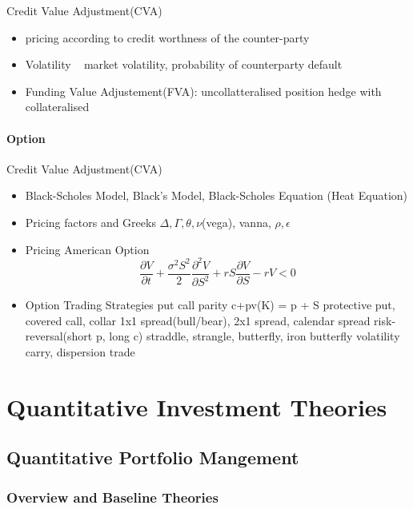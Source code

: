 \documentclass[11pt, openany]{book}              %
\begin{document}
Credit Value Adjustment(CVA)
 \begin{itemize}
    \item pricing according to credit worthness of the counter-party
    \item Volatility ~ market volatility, probability of counterparty default 
    \item Funding Value Adjustement(FVA): uncollatteralised position hedge with collateralised
    
\end{itemize}

\subsection{Option}

Credit Value Adjustment(CVA)
 \begin{itemize}
    \item Black-Scholes Model, Black's Model, Black-Scholes Equation (Heat Equation)
    \item Pricing factors and Greeks $\Delta,\Gamma, \theta, \nu$(vega), vanna, $\rho,\epsilon$ 
    \item Pricing American Option
    $$\frac{\partial V}{\partial t} + \frac{\sigma^2 S^2}{2} \frac{\partial^2 V}{\partial S^2}+ r S \frac{\partial V}{\partial S} - rV < 0 $$
    \item Option Trading Strategies
     \subitem put call parity c+pv(K) = p + S
     \subitem protective put, covered call, collar
     \subitem 1x1 spread(bull/bear), 2x1 spread, calendar spread
     \subitem risk-reversal(short p, long c)
     \subitem straddle, strangle, butterfly, iron butterfly
     \subitem volatility carry, dispersion trade
\end{itemize}



\part{Quantitative Investment Theories}

\chapter{Quantitative Portfolio Mangement}


\section{Overview and Baseline Theories}
\end{document}

